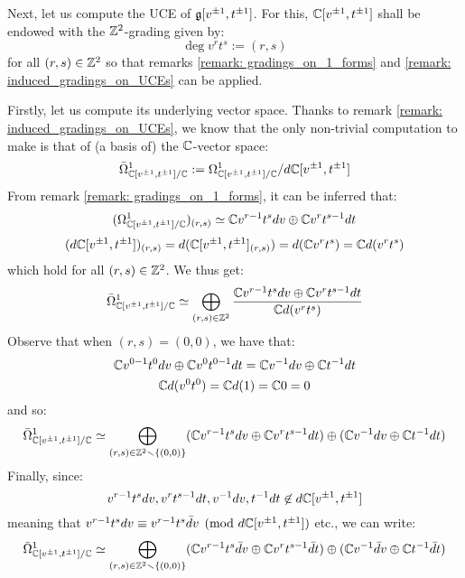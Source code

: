         \begin{example} \label{example: toroidal_lie_algebras_centres}
            Next, let us compute the UCE of $\mathfrak{g}[v^{\pm 1}, t^{\pm 1}]$. For this, $\mathbb{C}[v^{\pm 1}, t^{\pm 1}]$ shall be endowed with the $\mathbb{Z}^2$-grading given by:
                $$\deg v^r t^s := (r, s)$$
            for all $(r, s) \in \mathbb{Z}^2$ so that remarks \ref{remark: gradings_on_1_forms} and \ref{remark: induced_gradings_on_UCEs} can be applied. 
            
            Firstly, let us compute its underlying vector space. Thanks to remark \ref{remark: induced_gradings_on_UCEs}, we know that the only non-trivial computation to make is that of (a basis of) the $\mathbb{C}$-vector space:
                $$\bar{\Omega}^1_{\mathbb{C}[v^{\pm 1}, t^{\pm 1}]/\mathbb{C}} := \Omega^1_{\mathbb{C}[v^{\pm 1}, t^{\pm 1}]/\mathbb{C}}/d\mathbb{C}[v^{\pm 1}, t^{\pm 1}]$$
            From remark \ref{remark: gradings_on_1_forms}, it can be inferred that:
                $$( \Omega^1_{\mathbb{C}[v^{\pm 1}, t^{\pm 1}]/\mathbb{C}} )_{(r, s)} \simeq \mathbb{C} v^{r - 1} t^s dv \oplus \mathbb{C} v^r t^{s - 1} dt$$
                $$( d\mathbb{C}[v^{\pm 1}, t^{\pm 1}] )_{(r, s)} = d( \mathbb{C}[v^{\pm 1}, t^{\pm 1}]_{(r, s)} ) = d( \mathbb{C} v^r t^s ) = \mathbb{C} d(v^r t^s)$$
            which hold for all $(r, s) \in \mathbb{Z}^2$. We thus get:
                $$\bar{\Omega}^1_{\mathbb{C}[v^{\pm 1}, t^{\pm 1}]/\mathbb{C}} \simeq \bigoplus_{(r, s) \in \mathbb{Z}^2} \frac{ \mathbb{C} v^{r - 1} t^s dv \oplus \mathbb{C} v^r t^{s - 1} dt }{ \mathbb{C} d(v^r t^s) }$$
            Observe that when $(r, s) = (0, 0)$, we have that:
                $$\mathbb{C} v^{0 - 1} t^0 dv \oplus \mathbb{C} v^0 t^{0 - 1} dt = \mathbb{C} v^{-1} dv \oplus \mathbb{C} t^{-1} dt$$
                $$\mathbb{C} d(v^0 t^0) = \mathbb{C} d(1) = \mathbb{C} 0 = 0$$
            and so:
                $$\bar{\Omega}^1_{\mathbb{C}[v^{\pm 1}, t^{\pm 1}]/\mathbb{C}} \simeq \bigoplus_{(r, s) \in \mathbb{Z}^2 \smallsetminus \{(0, 0)\}} ( \mathbb{C} v^{r - 1} t^s dv \oplus \mathbb{C} v^r t^{s - 1} dt ) \oplus ( \mathbb{C} v^{-1} dv \oplus \mathbb{C} t^{-1} dt )$$
            Finally, since:
                $$v^{r - 1} t^s dv, v^r t^{s - 1} dt, v^{-1} dv, t^{-1} dt \not \in d\mathbb{C}[v^{\pm 1}, t^{\pm 1}]$$
            meaning that $v^{r - 1} t^s dv \equiv v^{r - 1} t^s \bar{d}v \pmod{d\mathbb{C}[v^{\pm 1}, t^{\pm 1}]}$ etc., we can write:
                $$\bar{\Omega}^1_{\mathbb{C}[v^{\pm 1}, t^{\pm 1}]/\mathbb{C}} \simeq \bigoplus_{(r, s) \in \mathbb{Z}^2 \smallsetminus \{(0, 0)\}} ( \mathbb{C} v^{r - 1} t^s \bar{d}v \oplus \mathbb{C} v^r t^{s - 1} \bar{d}t ) \oplus ( \mathbb{C} v^{-1} \bar{d}v \oplus \mathbb{C} t^{-1} \bar{d}t )$$
            

\end{example}
